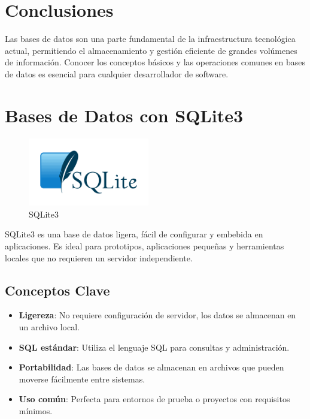 \documentclass[
  a4paper,
  DIV=11,
  numbers=noendperiod,
  onepage,
  openany]{scrreprt}
\providecommand{\tightlist}{%
  \setlength{\itemsep}{0pt}\setlength{\parskip}{0pt}}\usepackage{longtable,booktabs,array}
\begin{document}
\chapter{Conclusiones}\label{conclusiones-7}

Las bases de datos son una parte fundamental de la infraestructura
tecnológica actual, permitiendo el almacenamiento y gestión eficiente de
grandes volúmenes de información. Conocer los conceptos básicos y las
operaciones comunes en bases de datos es esencial para cualquier
desarrollador de software.

\chapter{Bases de Datos con SQLite3}\label{bases-de-datos-con-sqlite3}

\begin{figure}[H]

{\centering \includegraphics[width=2.08333in,height=\textheight,keepaspectratio]{unidades/unidad6/./images/sqlite_logo.png}

}

\caption{SQLite3}

\end{figure}%

SQLite3 es una base de datos ligera, fácil de configurar y embebida en
aplicaciones. Es ideal para prototipos, aplicaciones pequeñas y
herramientas locales que no requieren un servidor independiente.

\section{Conceptos Clave}\label{conceptos-clave-11}

\begin{itemize}
\tightlist
\item
  \textbf{Ligereza}: No requiere configuración de servidor, los datos se
  almacenan en un archivo local.
\item
  \textbf{SQL estándar}: Utiliza el lenguaje SQL para consultas y
  administración.
\item
  \textbf{Portabilidad}: Las bases de datos se almacenan en archivos que
  pueden moverse fácilmente entre sistemas.
\item
  \textbf{Uso común}: Perfecta para entornos de prueba o proyectos con
  requisitos mínimos.
\end{itemize}
\end{document}
